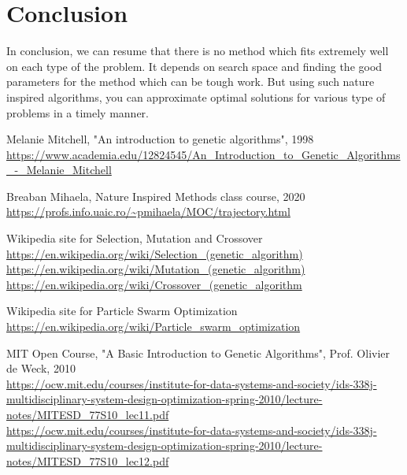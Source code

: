 \documentclass{article}
\begin{document}
\section{Conclusion}
In conclusion, we can resume that there is no method which fits extremely well on each type of the problem. It depends on search space and finding the good parameters for the method which can be tough work. But using such nature inspired algorithms, you can approximate optimal solutions for various type of problems in a timely manner.


\begin{thebibliography}{9}
\bibitem{} 
Melanie Mitchell, "An introduction to genetic algorithms", 1998
\\\url{https://www.academia.edu/12824545/An_Introduction_to_Genetic_Algorithms_-_Melanie_Mitchell}

\bibitem{} 
Breaban Mihaela, Nature Inspired Methods class course, 2020
\\\url{https://profs.info.uaic.ro/~pmihaela/MOC/trajectory.html}

\bibitem{} 
Wikipedia site for Selection, Mutation and Crossover
\\\url{https://en.wikipedia.org/wiki/Selection_(genetic_algorithm)}
\\\url{https://en.wikipedia.org/wiki/Mutation_(genetic_algorithm)}
\\\url{https://en.wikipedia.org/wiki/Crossover_(genetic_algorithm}

\bibitem{} 
Wikipedia site for Particle Swarm Optimization
\\\url{https://en.wikipedia.org/wiki/Particle_swarm_optimization}

\bibitem{}
MIT Open Course, "A Basic Introduction to Genetic Algorithms", Prof. Olivier de Weck, 2010
\\\url{https://ocw.mit.edu/courses/institute-for-data-systems-and-society/ids-338j-multidisciplinary-system-design-optimization-spring-2010/lecture-notes/MITESD_77S10_lec11.pdf}
\\\url{https://ocw.mit.edu/courses/institute-for-data-systems-and-society/ids-338j-multidisciplinary-system-design-optimization-spring-2010/lecture-notes/MITESD_77S10_lec12.pdf}
\end{thebibliography}
\end{document}

